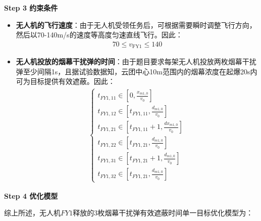 \documentclass[../main.tex]{subfiles}
\begin{document}
\textbf{Step 3 约束条件}
\begin{itemize}
\item \textbf{无人机的飞行速度}：由于无人机受领任务后，可根据需要瞬时调整飞行方向，然后以70-140m/s的速度等高度匀速直线飞行。因此：
\begin{align}\label{15.8}
  70 \leq v_{\text{FY1}} \leq 140
\end{align}
\item \textbf{无人机投放的烟幕干扰弹的时间}：由于题目要求每架无人机投放两枚烟幕干扰弹至少间隔1s，且据试验数据知，云团中心10m范围内的烟幕浓度在起爆20s内可为目标提供有效遮蔽。因此：
\begin{align}
\left\{ \begin{array}{l}
	t_{FY1,11}\in \left[ 0, \frac{x_{m1,0}}{v_0} \right]
	\\
	t_{FY1,12}\in \left[ t_{FY1,11}, \frac{d_{m1,0}}{v_0} \right]
	\\
	t_{FY1,21}\in \left[ t_{FY1,11}+1, \frac{dx_{m1,0}}{v_0} \right]
	\\
	t_{FY1,22}\in \left[ t_{FY1,21}, \frac{d_{m1,0}}{v_0} \right]
	\\
	t_{FY1,31}\in \left[ t_{FY1,21}+1, \frac{d_{m1,0}}{v_0} \right]
	\\
	t_{FY1,32}\in \left[ t_{FY1,21}, \frac{d_{m1,0}}{v_0} \right]
\end{array} \right. 
\end{align}
\end{itemize}
\textbf{Step 4 优化模型}
\par 综上所述，无人机$FY1$释放的3枚烟幕干扰弹有效遮蔽时间单一目标优化模型为：
\end{document}

